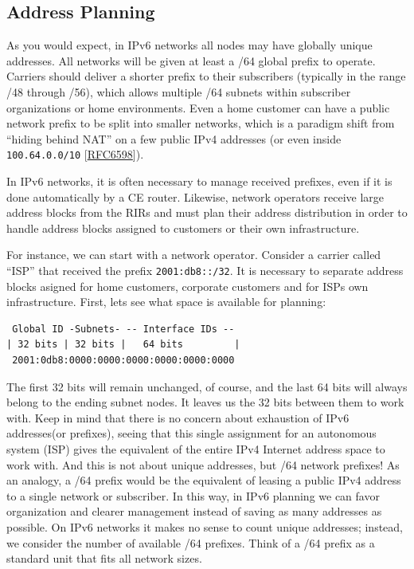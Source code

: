 \documentclass[
]{article}
\begin{document}
\pagebreak

\subsection{Address Planning}\label{address-planning}

As you would expect, in IPv6 networks all nodes may have globally unique
addresses. All networks will be given at least a /64 global prefix to
operate. Carriers should deliver a shorter prefix to their subscribers
(typically in the range /48 through /56), which allows multiple /64
subnets within subscriber organizations or home environments. Even a
home customer can have a public network prefix to be split into smaller
networks, which is a paradigm shift from ``hiding behind NAT'' on a few
public IPv4 addresses (or even inside \texttt{100.64.0.0/10}
{[}\href{https://www.rfc-editor.org/info/rfc6598}{RFC6598}{]}).

In IPv6 networks, it is often necessary to manage received prefixes,
even if it is done automatically by a CE router. Likewise, network
operators receive large address blocks from the RIRs and must plan their
address distribution in order to handle address blocks assigned to
customers or their own infrastructure.

For instance, we can start with a network operator. Consider a carrier
called ``ISP'' that received the prefix \texttt{2001:db8::/32}. It is
necessary to separate address blocks asigned for home customers,
corporate customers and for ISP\textquotesingle s own infrastructure.
First, let\textquotesingle s see what space is available for planning:

\begin{verbatim}
 Global ID -Subnets- -- Interface IDs --
| 32 bits | 32 bits |   64 bits         |
 2001:0db8:0000:0000:0000:0000:0000:0000
\end{verbatim}

The first 32 bits will remain unchanged, of course, and the last 64 bits
will always belong to the ending subnet nodes. It leaves us the 32 bits
between them to work with. Keep in mind that there is no concern about
exhaustion of IPv6 addresses(or prefixes), seeing that this single
assignment for an autonomous system (ISP) gives the equivalent of the
entire IPv4 Internet address space to work with. And this is not about
unique addresses, but /64 network prefixes! As an analogy, a /64 prefix
would be the equivalent of leasing a public IPv4 address to a single
network or subscriber. In this way, in IPv6 planning we can favor
organization and clearer management instead of saving as many addresses
as possible. On IPv6 networks it makes no sense to count unique
addresses; instead, we consider the number of available /64 prefixes.
Think of a /64 prefix as a standard unit that fits all network sizes.
\end{document}
